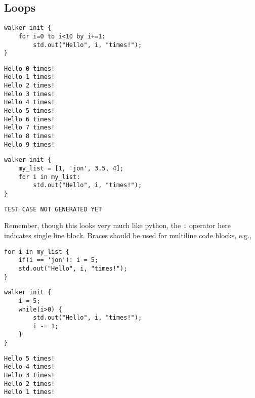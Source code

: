 \subsection*{Loops}
\begin{description}
    \begin{lstlisting}[caption={\texttt{for} loops}]
walker init {
    for i=0 to i<10 by i+=1:
        std.out("Hello", i, "times!");
}
    \end{lstlisting}
    \item[Output] \texttt{}
          \begin{lstlisting}[language=shell]
Hello 0 times!
Hello 1 times!
Hello 2 times!
Hello 3 times!
Hello 4 times!
Hello 5 times!
Hello 6 times!
Hello 7 times!
Hello 8 times!
Hello 9 times!
        \end{lstlisting}
    \item[Description] \texttt{}
\end{description}

\begin{description}
    \begin{lstlisting}[caption={\texttt{for} loops iterating through lists}]
walker init {
    my_list = [1, 'jon', 3.5, 4];
    for i in my_list:
        std.out("Hello", i, "times!");
}
    \end{lstlisting}
    \item[Output] \texttt{}
          \begin{lstlisting}[language=shell]
TEST CASE NOT GENERATED YET
        \end{lstlisting}
    \item[Description] \texttt{}



          \begin{remark}
              \begin{tBox}
                  Remember, though this looks very much like python, the \texttt{:} operator here indicates single line block. Braces should be used for multiline code blocks, e.g.,
                  \begin{lstlisting}
for i in my_list {
    if(i == 'jon'): i = 5;
    std.out("Hello", i, "times!");
}
        \end{lstlisting}
              \end{tBox}
          \end{remark}
\end{description}

\begin{description}
    \begin{lstlisting}[caption={ \texttt{while} loops }]
walker init {
    i = 5;
    while(i>0) {
        std.out("Hello", i, "times!");
        i -= 1;
    }
}
    \end{lstlisting}
    \item[Output] \texttt{}
          \begin{lstlisting}[language=shell]
Hello 5 times!
Hello 4 times!
Hello 3 times!
Hello 2 times!
Hello 1 times!
        \end{lstlisting}
    \item[Description] \texttt{}
\end{description}


